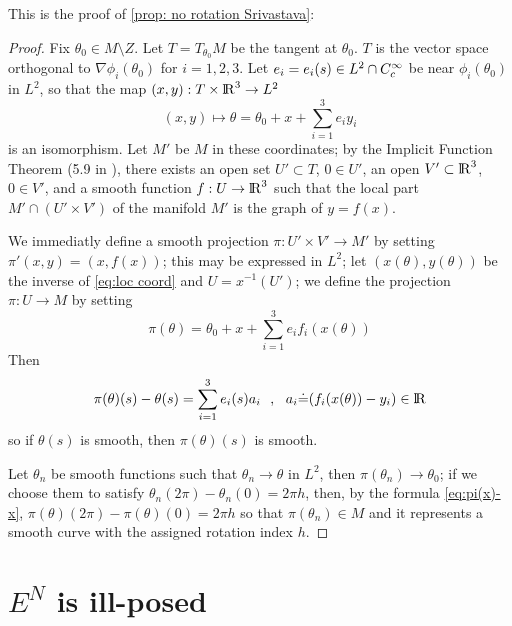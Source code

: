 \documentclass[twoside,a4paper,english]{article}
\begin{document}
This is the proof of \ref{prop: no rotation Srivastava}:
\begin{proof}
  Fix $\theta_0\in M\setminus Z$. Let $T=T_{\theta_0} M$ be the
  tangent at $\theta_0$. $T$ is the vector space orthogonal to
  $\nabla \phi_i(\theta_0)$ for $i=1,2,3$.
  Let $e_i=e_i(s)\in L^2\cap C^\infty_c$
  be near $\phi_i(\theta_0)$ in $L^2$, so that the map
  $(x,y):T\times{\protect\mathrm{l\hskip-0.15em R}}^3\to L^2$
  \begin{equation}
    (x,y) \mapsto 
    \theta=\theta_0+x + \sum_{i=1}^3  e_i y_i 
    \label{eq:loc coord}      
  \end{equation}
  is an isomorphism.
  Let $M'$ be $M$ in these coordinates; by the Implicit Function
  Theorem (5.9 in \cite{Lang:FDG}), there exists an open set
  $U'\subset T$, $0\in U'$, an open $V'\subset {\protect\mathrm{l\hskip-0.15em R}}^3$, $0\in
  V'$, and a smooth function $f:U\to{\protect\mathrm{l\hskip-0.15em R}}^3$ such that the local
  part $M'\cap(U'\times V')$ of the manifold $M'$ is the graph of
  $y=f(x)$.
    
  We immediatly define a smooth projection $\pi:U'\times V'\to M'$
  by setting $\pi'(x,y) = (x, f(x))$; this may be expressed in
  $L^2$; let $(x(\theta),y(\theta))$ be the inverse of
  \eqref{eq:loc coord} and $U=x^{-1}(U')$; we define the
  projection $\pi:U\to M$ by setting
  \[\pi(\theta) = \theta_0+x + \sum_{i=1}^3  e_i f_i(x(\theta)) \] Then
  \begin{equation}
    \pi(\theta)(s)-\theta(s) = \sum_{i=1}^3 e_i(s) a_i ~~,~~
    a_i{\stackrel{\mbox{.}}{=}} (f_i(x(\theta))-y_i)\in{\protect\mathrm{l\hskip-0.15em R}} \label{eq:pi(x)-x}    
  \end{equation}
  so if $\theta(s)$ is smooth, then $\pi(\theta)(s)$ is smooth.
  
  Let $\theta_n$ be smooth functions such that $\theta_n\to
  \theta$ in $L^2$, then $\pi(\theta_n)\to \theta_0$; if we choose
  them to satisfy $\theta_n(2\pi)-\theta_n(0)=2\pi h$, then, by
  the formula \eqref{eq:pi(x)-x}, $
  \pi(\theta)(2\pi)-\pi(\theta)(0) =2\pi h$ so that
  $\pi(\theta_n)\in M$ and it represents a smooth curve with the
  assigned rotation index $h$.
\end{proof}


\section{$E^N$ is ill-posed}
\label{sec: ill-posedness}
\end{document}
